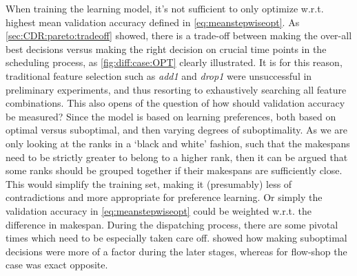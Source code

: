 When training the learning model, it's not sufficient to only optimize w.r.t. 
highest mean validation accuracy defined in \cref{eq:meanstepwiseopt}. 
As \cref{sec:CDR:pareto:tradeoff} showed, there is a trade-off between making 
the over-all best decisions versus making the right decision on crucial time 
points in the scheduling process, as \cref{fig:diff:case:OPT} 
clearly illustrated. It is for this reason, traditional feature selection such 
as \emph{add1} and \emph{drop1} were unsuccessful in preliminary experiments, 
and thus resorting to exhaustively searching all feature combinations.
This also opens of the question of how should validation accuracy be measured? 
Since the model is based on learning preferences, both based on optimal versus 
suboptimal, and then varying degrees of suboptimality. As we are only looking 
at the ranks in a `black and white' fashion, such that the makespans need to be 
strictly greater to belong to a higher rank, then it can be argued that some 
ranks should be grouped together if their makespans are sufficiently close. 
This would simplify the training set, making it (presumably) less of 
contradictions and more appropriate for preference learning. Or simply the 
validation accuracy in \cref{eq:meanstepwiseopt} could be weighted w.r.t. the  
difference in makespan.
During the dispatching process, there are some pivotal times which need to be 
especially taken care off.  showed how making 
suboptimal decisions were more of a factor during the later stages, whereas for 
flow-shop the case was exact opposite. 

